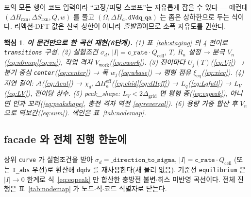 \documentclass[11pt,a4paper]{article}
\newtheorem*{keybox}{핵심}
\newcommand{\eff}{\mathrm{eff}}
\newcommand{\eq}{\mathrm{eq}}
\newcommand{\cell}{\mathrm{cell}}
\newcommand{\rxn}{\mathrm{rxn}}
\newcommand{\work}{\mathrm{work}}
\newcommand{\code}[1]{\texttt{#1}}
\begin{document}
표의 모든 행이 코드 입력이라 ``고정/피팅 스코프''는 자유롭게 잡을 수 있다 — 예컨대 $(\Delta H_\rxn,\Delta S_\rxn,Q,w)$ 를
풀고 $(\Omega,\Delta H_a,\code{dVdq\_qa})$ 는 좁은 상하한으로 두는 식이다. 리액션$\cdot$DFT 값은 신뢰 상한이 아니라
\emph{출발점}이므로 소폭 자유도를 권한다.

\begin{keybox}
\textbf{이 문건만으로 한 곡선 재현(6단계).}
(1) 표~\ref{tab:staging} 의 4 전이로 \code{transitions} 구성.
(2) 실험조건 $\sigma_d$, $|I|=\code{c\_rate}\cdot Q_\cell$, $T$, $R_n$ 설정 → 분극 $V_n$(\eqref{eq:n0map}\eqref{eq:vn}), 작업 격자 $V_\work$(\eqref{eq:vwork}).
(3) 전이마다 $U_j(T)$(\eqref{eq:Uj}) → 분기 중심 \code{center}(\eqref{eq:center}) → 폭 $w_j$(\eqref{eq:wbase}) → 평형 점유 $\xi_\eq$(\eqref{eq:xieq}).
(4) 지연 길이: $\mathcal A$(\eqref{eq:Acut}) → $\chi_d,\Delta H_a^\eff$(\eqref{eq:chid}\eqref{eq:dHeff}) → $L_q$(\eqref{eq:Lqfull}) → $L_V$(\eqref{eq:LV}), 전이당 상수.
(5) peak\_shape: $L_V<2\Delta_\mathrm{grid}$ 면 평형 종(\eqref{eq:eqpeak}), 아니면 인과 꼬리(\eqref{eq:peakshape}, 충전 격자 역전 \eqref{eq:reversal}).
(6) 용량 가중 합산 후 $V_n$ 으로 역보간(\eqref{eq:sum}). 색인은 표~\ref{tab:nodemap}.
\end{keybox}

\subsection{facade 와 전체 진행 한눈에}
상위 \code{curve} 가 실험조건을 받아 $\sigma_d=\code{\_direction\_to\_sigma}$, $|I|=\code{c\_rate}\cdot Q_\cell$
(또는 \code{I\_abs} 우선)로 환산해 \code{dqdv} 를 재사용한다(새 물리 없음). 기준선 \code{equilibrium} 은
$|I|\to0$ 한계로 식~\eqref{eq:eqpeak} 만 합산한 충방전 불변$\cdot$히스 미반영 곡선이다. 전체 진행은 표~\ref{tab:nodemap}
가 노드$\cdot$식$\cdot$코드 식별자로 닫는다.
\end{document}
